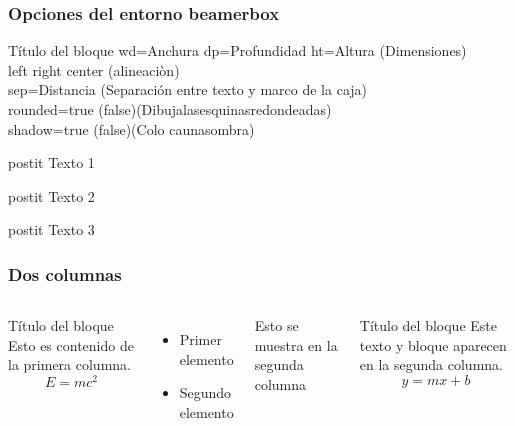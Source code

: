 \documentclass{beamer}
\begin{document}
   \begin{frame}
   \frametitle{Opciones del entorno beamerbox} 
      \begin{block}{Título del bloque}
        wd={Anchura} dp={Profundidad} ht={Altura} (Dimensiones)\\
        left right center (alineaciòn)\\
        sep=Distancia (Separación entre texto y marco de la caja)\\
        rounded=true (false)(Dibujalasesquinasredondeadas) \\
        shadow=true (false)(Colo caunasombra)
      \end{block}
      \begin{beamercolorbox}[sep=3mm]{postit}
        Texto 1
      \end{beamercolorbox}
      \begin{beamercolorbox}[wd=3cm,sep=3mm]{postit}
        Texto 2
      \end{beamercolorbox}
      \begin{beamercolorbox}[wd={4cm},sep=1mm,center,rounded=true,shadow=true]{postit}
        Texto 3
      \end{beamercolorbox}
   \end{frame}


  \begin{frame}
  \frametitle{Dos columnas}
  \begin{columns}

    \begin{block}{Título del bloque}
      Esto es contenido de la primera columna.
      $$E=mc^2$$
    \end{block}
    \begin{itemize}
      \item Primer elemento
      \item Segundo elemento  
    \end{itemize}   

    Esto se muestra en la segunda columna
    \begin{exampleblock}{Título del bloque}
      Este texto y bloque aparecen en la segunda columna.
      $$ y=mx+b $$
    \end{exampleblock}

  \end{columns}
  \end{frame}
\end{document}
